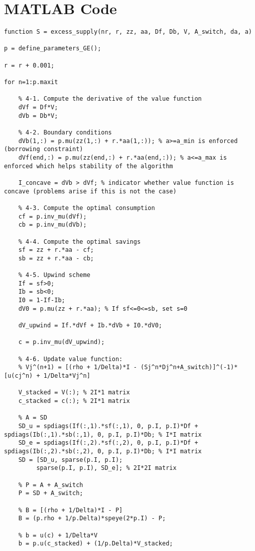 \section*{MATLAB Code}
\begin{lstlisting}
function S = excess_supply(nr, r, zz, aa, Df, Db, V, A_switch, da, a)

p = define_parameters_GE();

r = r + 0.001;

for n=1:p.maxit

    % 4-1. Compute the derivative of the value function 
    dVf = Df*V;
    dVb = Db*V;

    % 4-2. Boundary conditions
    dVb(1,:) = p.mu(zz(1,:) + r.*aa(1,:)); % a>=a_min is enforced (borrowing constraint)
    dVf(end,:) = p.mu(zz(end,:) + r.*aa(end,:)); % a<=a_max is enforced which helps stability of the algorithm

    I_concave = dVb > dVf; % indicator whether value function is concave (problems arise if this is not the case)

    % 4-3. Compute the optimal consumption
    cf = p.inv_mu(dVf);
    cb = p.inv_mu(dVb);
    
    % 4-4. Compute the optimal savings
    sf = zz + r.*aa - cf;
    sb = zz + r.*aa - cb;

    % 4-5. Upwind scheme
    If = sf>0;
    Ib = sb<0;
    I0 = 1-If-Ib;
    dV0 = p.mu(zz + r.*aa); % If sf<=0<=sb, set s=0

    dV_upwind = If.*dVf + Ib.*dVb + I0.*dV0;

    c = p.inv_mu(dV_upwind);

    % 4-6. Update value function: 
    % Vj^(n+1) = [(rho + 1/Delta)*I - (Sj^n*Dj^n+A_switch)]^(-1)*[u(cj^n) + 1/Delta*Vj^n]
    
    V_stacked = V(:); % 2I*1 matrix
    c_stacked = c(:); % 2I*1 matrix

    % A = SD
    SD_u = spdiags(If(:,1).*sf(:,1), 0, p.I, p.I)*Df + spdiags(Ib(:,1).*sb(:,1), 0, p.I, p.I)*Db; % I*I matrix
    SD_e = spdiags(If(:,2).*sf(:,2), 0, p.I, p.I)*Df + spdiags(Ib(:,2).*sb(:,2), 0, p.I, p.I)*Db; % I*I matrix
    SD = [SD_u, sparse(p.I, p.I);
         sparse(p.I, p.I), SD_e]; % 2I*2I matrix
   
    % P = A + A_switch
    P = SD + A_switch;

    % B = [(rho + 1/Delta)*I - P]
    B = (p.rho + 1/p.Delta)*speye(2*p.I) - P; 

    % b = u(c) + 1/Delta*V
    b = p.u(c_stacked) + (1/p.Delta)*V_stacked;


\end{lstlisting}
